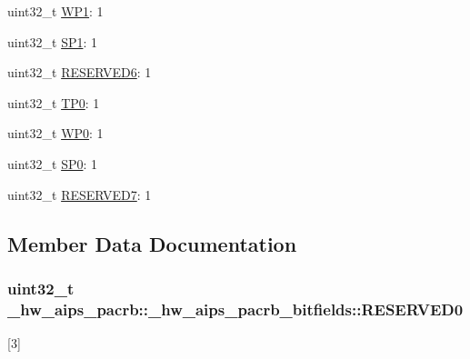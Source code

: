 \begin{DoxyCompactItemize}
\item 
uint32\+\_\+t \hyperlink{struct__hw__aips__pacrb_1_1__hw__aips__pacrb__bitfields_ac2e8bfe542e4ef2febd915e442a3c68f}{W\+P1}\+: 1
\item 
uint32\+\_\+t \hyperlink{struct__hw__aips__pacrb_1_1__hw__aips__pacrb__bitfields_a6c6f085b3fd9b7fffc12257590c212b7}{S\+P1}\+: 1
\item 
uint32\+\_\+t \hyperlink{struct__hw__aips__pacrb_1_1__hw__aips__pacrb__bitfields_aab3d2a693c302fbe07772b3e1099de52}{R\+E\+S\+E\+R\+V\+E\+D6}\+: 1
\item 
uint32\+\_\+t \hyperlink{struct__hw__aips__pacrb_1_1__hw__aips__pacrb__bitfields_a25fb4a912ece82e57235af4cb4c4e680}{T\+P0}\+: 1
\item 
uint32\+\_\+t \hyperlink{struct__hw__aips__pacrb_1_1__hw__aips__pacrb__bitfields_a0f9227d7c9947a4644777d67234c08da}{W\+P0}\+: 1
\item 
uint32\+\_\+t \hyperlink{struct__hw__aips__pacrb_1_1__hw__aips__pacrb__bitfields_a7a6d3b790120d40f0bde48bdbda1e9cf}{S\+P0}\+: 1
\item 
uint32\+\_\+t \hyperlink{struct__hw__aips__pacrb_1_1__hw__aips__pacrb__bitfields_a543e8d2dde00eb190f180c995e13b6e3}{R\+E\+S\+E\+R\+V\+E\+D7}\+: 1
\end{DoxyCompactItemize}


\subsection{Member Data Documentation}
\subsubsection[{\texorpdfstring{R\+E\+S\+E\+R\+V\+E\+D0}{RESERVED0}}]{\setlength{\rightskip}{0pt plus 5cm}uint32\+\_\+t \+\_\+hw\+\_\+aips\+\_\+pacrb\+::\+\_\+hw\+\_\+aips\+\_\+pacrb\+\_\+bitfields\+::\+R\+E\+S\+E\+R\+V\+E\+D0}\hypertarget{struct__hw__aips__pacrb_1_1__hw__aips__pacrb__bitfields_a41d29054e3a381a30e760978c9ae690d}{}\label{struct__hw__aips__pacrb_1_1__hw__aips__pacrb__bitfields_a41d29054e3a381a30e760978c9ae690d}
\mbox{[}3\mbox{]} 

